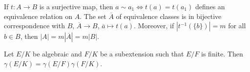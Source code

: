 \lecture 
If $t\colon A\to B$ is a surjective map, then 
$a\sim a_1\Longleftrightarrow t(a)=t(a_1)$ 
defines an equivalence relation on $A$. The set $\overline{A}$ 
of equivalence classes is in bijective correspondence with $B$,
$\overline{A}\to B$, $\overline{a}\mapsto t(a)$. 
Moreover, if $|t^{-1}(\{b\})|=m$ for all $b\in B$, then 
$|A|=m|\overline{A}|=m|B|$. 

\begin{proposition}
    Let $E/K$ be algebraic and $F/K$ be a subextension such that 
    $E/F$ is finite. Then $\gamma(E/K)=\gamma(E/F)\gamma(F/K)$. 
\end{proposition}

